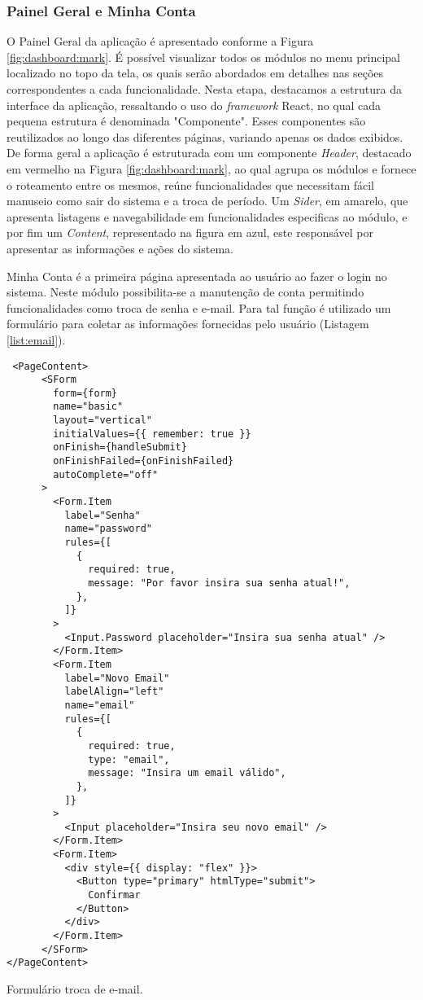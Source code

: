\subsubsection{Painel Geral e Minha Conta}

O Painel Geral da aplicação é apresentado conforme a Figura \ref{fig:dashboard:mark}. É possível visualizar todos os módulos no menu principal localizado no topo da tela, os quais serão abordados em detalhes nas seções correspondentes a cada funcionalidade. Nesta etapa, destacamos a estrutura da interface da aplicação, ressaltando o uso do \textit{framework} React, no qual cada pequena estrutura é denominada "Componente". Esses componentes são reutilizados ao longo das diferentes páginas, variando apenas os dados exibidos. De forma geral a aplicação é estruturada com um componente \textit{Header}, destacado em vermelho na Figura \ref{fig:dashboard:mark}, ao qual agrupa os módulos e fornece o roteamento entre os mesmos, reúne funcionalidades que necessitam fácil manuseio como sair do sistema e a troca de período. Um \textit{Sider}, em amarelo, que apresenta listagens e navegabilidade em funcionalidades especificas ao módulo, e por fim um \textit{Content}, representado na figura em azul, este responsável por apresentar as informações e ações do sistema.

Minha Conta é a primeira página apresentada ao usuário ao fazer o login no sistema. Neste módulo possibilita-se a manutenção de conta permitindo funcionalidades como troca de senha e e-mail. Para tal função é utilizado um formulário para coletar as informações fornecidas pelo usuário (Listagem \ref{list:email}).

\begin{listing}[!h]
    \begin{verbatim}
 <PageContent>
      <SForm
        form={form}
        name="basic"
        layout="vertical"
        initialValues={{ remember: true }}
        onFinish={handleSubmit}
        onFinishFailed={onFinishFailed}
        autoComplete="off"
      >
        <Form.Item
          label="Senha"
          name="password"
          rules={[
            {
              required: true,
              message: "Por favor insira sua senha atual!",
            },
          ]}
        >
          <Input.Password placeholder="Insira sua senha atual" />
        </Form.Item>
        <Form.Item
          label="Novo Email"
          labelAlign="left"
          name="email"
          rules={[
            {
              required: true,
              type: "email",
              message: "Insira um email válido",
            },
          ]}
        >
          <Input placeholder="Insira seu novo email" />
        </Form.Item>
        <Form.Item>
          <div style={{ display: "flex" }}>
            <Button type="primary" htmlType="submit">
              Confirmar
            </Button>
          </div>
        </Form.Item>
      </SForm>
</PageContent>
    \end{verbatim}
    \caption{Formulário troca de e-mail.}
    \label{list:email}
\end{listing}



